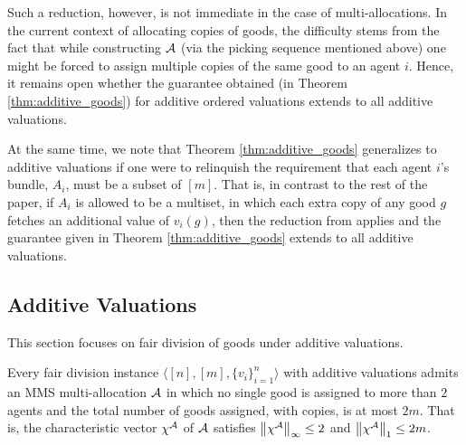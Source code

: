 Such a reduction, however, is not immediate in the case of multi-allocations. In the current context of allocating copies of goods, the difficulty stems from the fact that while constructing $\mathcal{A}$ (via the picking sequence mentioned above) one might be forced to assign multiple copies of the same good to an agent $i$. Hence, it remains open whether the guarantee obtained (in Theorem \ref{thm:additive_goods}) for additive ordered valuations extends to all additive valuations. 

At the same time, we note that Theorem \ref{thm:additive_goods} generalizes to additive valuations if one were to relinquish the requirement that each agent $i$'s bundle, $A_i$, must be a subset of $[m]$. That is, in contrast to the rest of the paper, if $A_i$ is allowed to be a multiset, in which each extra copy of any good $g$ fetches an additional value of $v_i(g)$, then the reduction from \cite{10.5555/2615731.2617458} applies and the guarantee given in Theorem \ref{thm:additive_goods} extends to all additive valuations. 


\subsection{Additive Valuations}
This section focuses on fair division of goods under additive valuations. 

\begin{theorem} 
\label{thm:additive_3_3m}
        Every fair division instance $\langle [n], [m], \{v_i\}_{i=1}^n \rangle$  with additive valuations admits an MMS multi-allocation $\mathcal{A}$ in which no single good is assigned to more than $2$ agents and the total number of goods assigned, with copies, is at most $2m$. That is, the characteristic vector $\chi^{\mathcal{A}}$ of $\mathcal{A}$ satisfies $\left\|\chi^{\mathcal{A}}\right\|_\infty \leq 2$ and $\left\|\chi^{\mathcal{A}}\right\|_1 \leq 2m$.
\end{theorem}

